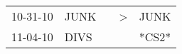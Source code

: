 \begin{supertabular}{p{0.07\textwidth}p{0.06\textwidth}p{0.02\textwidth}p{0.02\textwidth}p{0.06\textwidth}}
 10-31-10\textsuperscript{} &  JUNK\textsuperscript{} &   &  \textgreater &  JUNK\textsuperscript{} \\
 11-04-10\textsuperscript{} &  DIVS\textsuperscript{} &   &               &                   *CS2* \\
\end{supertabular}
